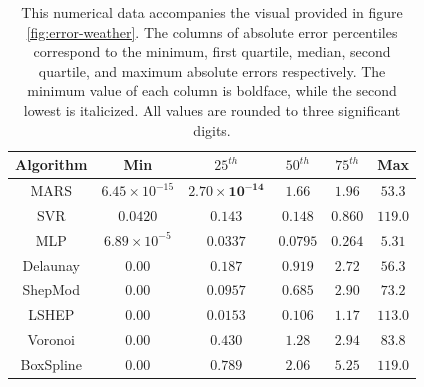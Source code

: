 \documentclass[smallextended,final]{svjour3}       %
\begin{document}
\begin{appendix}
\begin{table}
  \centering
  \begin{tabular}{c|c|c|c|c|c}
    \hline
    Algorithm & Min & $25^{th}$ & $50^{th}$ & $75^{th}$ & Max\\
    \hline
    MARS & $\mathit{6.45 \times 10^{-15}}$ & $\mathbf{2.70 \times 10^{-14}}$ & $1.66$ & $1.96$ & $\mathit{53.3}$\\
    SVR & $0.0420$ & $0.143$ & $0.148$ & $\mathit{0.860}$ & $119.0$\\
    MLP & $6.89 \times 10^{-5}$ & $0.0337$ & $\mathbf{0.0795}$ & $\mathbf{0.264}$ & $\mathbf{5.31}$\\
    Delaunay & $\mathbf{0.00}$ & $0.187$ & $0.919$ & $2.72$ & $56.3$\\
    ShepMod & $\mathbf{0.00}$ & $0.0957$ & $0.685$ & $2.90$ & $73.2$\\
    LSHEP & $\mathbf{0.00}$ & $\mathit{0.0153}$ & $\mathit{0.106}$ & $1.17$ & $113.0$\\
    Voronoi & $\mathbf{0.00}$ & $0.430$ & $1.28$ & $2.94$ & $83.8$\\
    BoxSpline & $\mathbf{0.00}$ & $0.789$ & $2.06$ & $5.25$ & $119.0$\\
    \hline
  \end{tabular}
  \caption{This numerical data accompanies the visual provided in
    figure \ref{fig:error-weather}. The columns of absolute error
    percentiles correspond to the minimum, first quartile, median,
    second quartile, and maximum absolute errors respectively. The
    minimum value of each column is boldface, while the second lowest
    is italicized. All values are rounded to three significant
    digits.}
  \label{table:error-weather}
\end{table}


\end{appendix}
\end{document}
